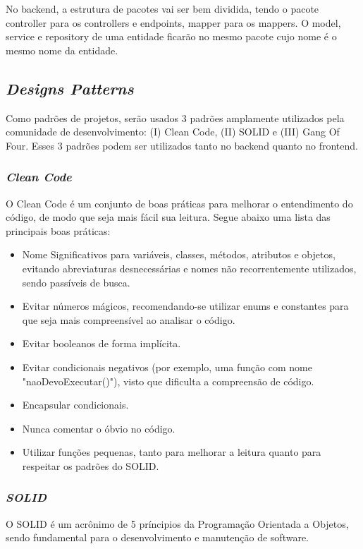 No \gls{backend}, a estrutura de pacotes vai ser bem dividida, tendo o pacote controller para os controllers e endpoints, mapper para os mappers. O model, service e repository de uma entidade ficarão no mesmo pacote cujo nome é o mesmo nome da entidade.

\subsection{\emph{Designs Patterns}}

Como padrões de projetos, serão usados 3 padrões amplamente utilizados pela comunidade de desenvolvimento: (I) Clean Code, (II) SOLID e (III) Gang Of Four. Esses 3 padrões podem ser utilizados tanto no backend quanto no frontend.

\subsubsection{\emph{Clean Code}}

O Clean Code é um conjunto de boas práticas para melhorar o entendimento do código, de modo que seja mais fácil sua leitura. Segue abaixo uma lista das principais boas práticas:

\begin{itemize}
	\item Nome Significativos para variáveis, classes, métodos, atributos e objetos, evitando abreviaturas desnecessárias e nomes não recorrentemente utilizados, sendo passíveis de busca.
	\item Evitar números mágicos, recomendando-se utilizar enums e constantes para que seja mais compreensível ao analisar o código.
	\item Evitar booleanos de forma implícita.
	\item Evitar condicionais negativos (por exemplo, uma função com nome "naoDevoExecutar()"), visto que dificulta a compreensão de código.
	\item Encapsular condicionais.
	\item Nunca comentar o óbvio no código.
	\item Utilizar funções pequenas, tanto para melhorar a leitura quanto para respeitar os padrões do SOLID.
\end{itemize}

\subsubsection{\emph{SOLID}}

O SOLID é um acrônimo de 5 príncipios da Programação Orientada a Objetos, sendo fundamental para o desenvolvimento e manutenção de software.

